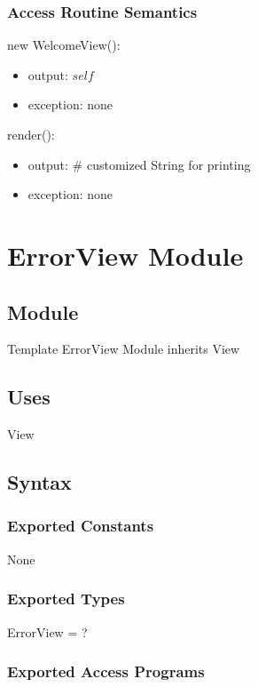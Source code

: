 \documentclass[12pt]{article}
\begin{document}
\subsubsection* {Access Routine Semantics}
new WelcomeView():
\begin{itemize}
\item output: $self$
\item exception: none
\end{itemize}
render():
\begin{itemize}
\item output: \# customized String for printing
\item exception: none
\end{itemize}

\newpage




\section* {ErrorView Module}

\subsection*{Module}

Template ErrorView Module inherits View

\subsection* {Uses}

View

\subsection* {Syntax}

\subsubsection* {Exported Constants}

None

\subsubsection* {Exported Types}

ErrorView = ?

\subsubsection* {Exported Access Programs}
\end{document}
